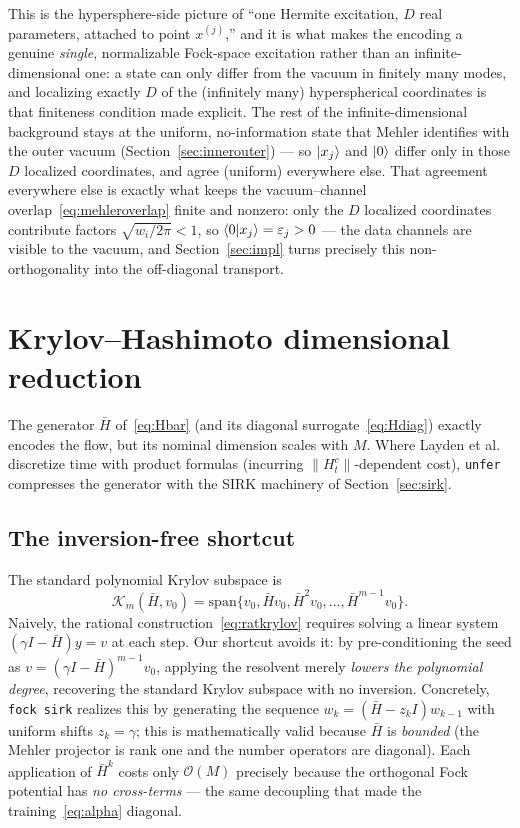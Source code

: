 \documentclass[11pt, a4paper]{article}
\newcommand{\Kry}{\mathcal{K}}
\begin{document}
This is the hypersphere-side picture of ``one Hermite excitation, $D$ real
parameters, attached to point $x^{(j)}$,'' and it is what makes the encoding
a genuine \emph{single}, normalizable Fock-space excitation rather than an
infinite-dimensional one: a state can only differ from the vacuum in
finitely many modes, and localizing exactly $D$ of the (infinitely many)
hyperspherical coordinates is that finiteness condition made explicit. The
rest of the infinite-dimensional background stays at the uniform,
no-information state that Mehler identifies with the outer vacuum
(Section~\ref{sec:innerouter}) --- so $\ket{x_j}$ and $\ket{0}$ differ only
in those $D$ localized coordinates, and agree (uniform) everywhere else.
That agreement everywhere else is exactly what keeps the vacuum--channel
overlap~\eqref{eq:mehleroverlap} finite and nonzero: only the $D$ localized
coordinates contribute factors $\sqrt{w_i/2\pi}<1$, so
$\braket{0|x_j}=\varepsilon_j>0$ --- the data channels are visible to the
vacuum, and Section~\ref{sec:impl} turns precisely this non-orthogonality
into the off-diagonal transport.

\section{Krylov--Hashimoto dimensional reduction}
\label{sec:krylov}

The generator $\bar H$ of~\eqref{eq:Hbar} (and its diagonal
surrogate~\eqref{eq:Hdiag}) exactly encodes the flow, but its nominal dimension
scales with $M$. Where Layden et al.~\cite{Layden2025} discretize time with
product formulas (incurring $\|H_t^c\|$-dependent cost), \texttt{unfer}
compresses the generator with the SIRK machinery of
Section~\ref{sec:sirk}.

\subsection{The inversion-free shortcut}

The standard polynomial Krylov subspace is
\begin{equation}
  \Kry_m(\bar H,v_0)=\mathrm{span}\{v_0,\bar H v_0,\bar H^2 v_0,\dots,
  \bar H^{m-1}v_0\}.
\end{equation}
Naively, the rational construction~\eqref{eq:ratkrylov} requires solving a
linear system $(\gamma I-\bar H)y=v$ at each step. Our shortcut avoids it: by
pre-conditioning the seed as $v=(\gamma I-\bar H)^{m-1}v_0$, applying the
resolvent merely \emph{lowers the polynomial degree}, recovering the standard
Krylov subspace with no inversion. Concretely, \texttt{fock\textunderscore
sirk} realizes this by generating the sequence $w_k=(\bar H-z_kI)w_{k-1}$ with
uniform shifts $z_k=\gamma$; this is mathematically valid because $\bar H$ is
\emph{bounded} (the Mehler projector is rank one and the number operators are
diagonal). Each application of $\bar H^k$ costs only $\mathcal{O}(M)$ precisely
because the orthogonal Fock potential has \emph{no cross-terms} --- the same
decoupling that made the training~\eqref{eq:alpha} diagonal.
\end{document}

